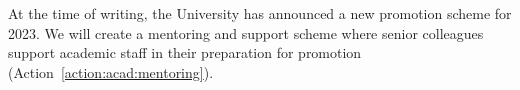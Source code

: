 





At the time of writing, the University has announced a new promotion scheme for 2023. We will 
create a mentoring and support scheme where senior colleagues support academic staff in their preparation for promotion (Action~\ref{action:acad:mentoring}). 

